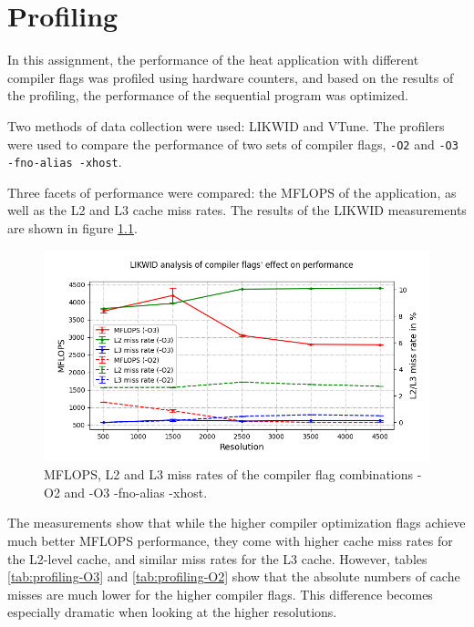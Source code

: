 \chapter{Profiling}



In this assignment, the performance of the heat application with different compiler flags was profiled using hardware counters, and based on the results of the profiling, the performance of the sequential program was optimized. 

Two methods of data collection were used: LIKWID and VTune. The profilers were used to compare the performance of two sets of compiler flags, \verb|-O2| and \verb|-O3 -fno-alias -xhost|.

Three facets of performance were compared: the MFLOPS of the application, as well as the L2 and L3 cache miss rates. The results of the LIKWID measurements are shown in figure \ref{fig:LIKWID}.

\begin{figure}[h]
    \centering
    \includegraphics[scale=0.6]{figures/O2_vs_O3_forreport.png}
    \caption{MFLOPS, L2 and L3 miss rates of the compiler flag combinations -O2 and -O3 -fno-alias -xhost.}
    \label{fig:LIKWID}
\end{figure}

The measurements show that while the higher compiler optimization flags achieve much better MFLOPS performance, they come with higher cache miss rates for the L2-level cache, and similar miss rates for the L3 cache. However, tables \ref{tab:profiling-O3} and \ref{tab:profiling-O2} show that the absolute numbers of cache misses are much lower for the higher compiler flags. This difference becomes especially dramatic when looking at the higher resolutions.

